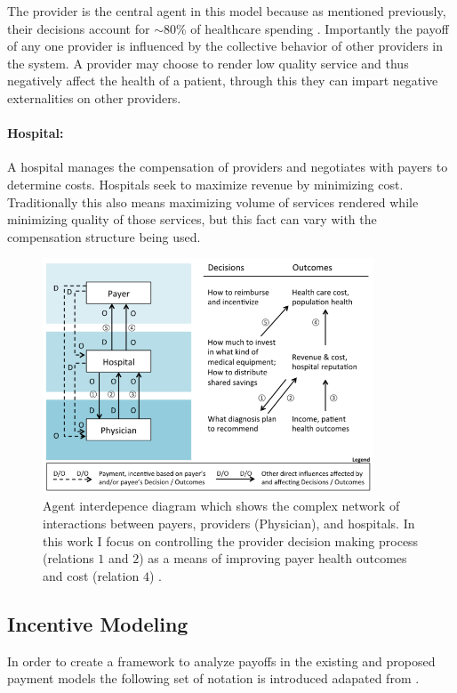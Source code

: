 \documentclass{article}
\begin{document}
The provider is the central agent in this model because as mentioned previously, their decisions account for ${\sim}80$\% of healthcare spending \cite{trust}. Importantly the payoff of any one provider is influenced by the collective behavior of other providers in the system. A provider may choose to render low quality service and thus negatively affect the health of a patient, through this they can impart negative externalities on other providers.

\paragraph*{Hospital:}A hospital manages the compensation of providers and negotiates with payers to determine costs. Hospitals seek to maximize revenue by minimizing cost. Traditionally this also means maximizing volume of services rendered while minimizing quality of those services, but this fact can vary with the compensation structure being used.

\begin{figure}[H]
\includegraphics[height=7cm]{agentdep}
\centering
\caption{Agent interdepence diagram which shows the complex network of interactions between payers, providers (Physician), and hospitals. In this work I focus on controlling the provider decision making process (relations $1$ and $2$) as a means of improving payer health outcomes and cost (relation $4$) \cite{msdt}.}
\label{fig:agentdep}
\end{figure}

\subsection*{Incentive Modeling}
In order to create a framework to analyze payoffs in the existing and proposed payment models the following set of notation is introduced adapated from \cite{blended}. 
\end{document}
